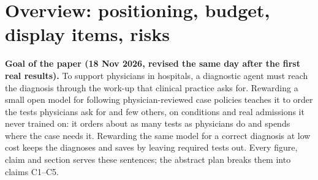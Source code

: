 
\section*{Overview: positioning, budget, display items, risks}

\noindent\textbf{Goal of the paper (18 Nov 2026, revised the same day after the first real results).}
To support physicians in hospitals, a diagnostic agent must reach the diagnosis through the work-up
that clinical practice asks for. Rewarding a small open model for following physician-reviewed case
policies teaches it to order the tests physicians ask for and few others, on conditions and real
admissions it never trained on: it orders about as many tests as physicians do and spends where the
case needs it. Rewarding the same model for a correct diagnosis at low cost keeps the diagnoses and
saves by leaving required tests out.
Every figure, claim and section serves these sentences; the abstract plan breaks them into claims C1--C5.


